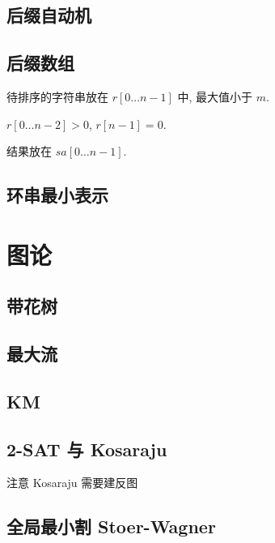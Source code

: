 \documentclass[landscape, twocolumn, 8pt, a4paper, twoside]{extarticle}
\begin{document}
  \subsection{后缀自动机}
    

  \subsection{后缀数组}
    待排序的字符串放在 $r[0 \ldots n - 1]$ 中, 最大值小于 $m$.
    
    $r[0 \ldots n - 2] > 0$, $r[n - 1] = 0$.
    
    结果放在 $sa[0 \ldots n - 1]$.
    
  
  \subsection{环串最小表示}
    

\section{图论}
  \subsection{带花树}
    

  \subsection{最大流}
    
  
  \subsection{KM}
    

  \subsection{2-SAT 与 Kosaraju}
    注意 Kosaraju 需要建反图
    

  \subsection{全局最小割 Stoer-Wagner}
    
\end{document}
